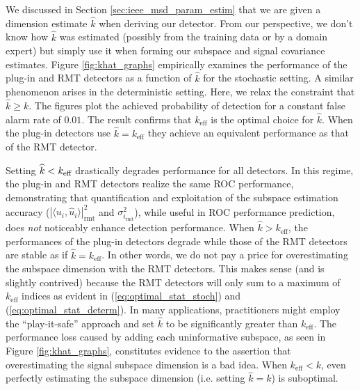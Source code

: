 We discussed in Section \ref{sec:ieee_msd_param_estim} that we are given a dimension estimate
$\widehat{k}$ when deriving our detector. From our perspective, we don't know how
$\widehat{k}$ was estimated (possibly from the training data or by a domain expert) but
simply use it when forming our subspace and signal covariance estimates. Figure
\ref{fig:khat_graphs} empirically examines the performance of the plug-in and RMT detectors
as a function of $\widehat{k}$ for the stochastic setting. A similar phenomenon arises in
the deterministic setting. Here, we relax the constraint that $\widehat{k}\geq k$. The figures plot the achieved probability of detection for a constant false alarm rate of $0.01$. The result confirms that $k_\text{eff}$ is the optimal choice for $\widehat{k}$. When the plug-in detectors use $\widehat{k} = k_\text{eff}$ they achieve an equivalent performance as that of the RMT detector.

Setting $\widehat{k} < k_\text{eff}$ drastically degrades performance for all detectors. In this regime, the plug-in and RMT detectors realize the same ROC performance, demonstrating that quantification and exploitation of the subspace estimation accuracy ($|\langle u_i,\widehat{u}_i\rangle |^2_{\text{rmt}}$ and $\sigma_{i_\text{rmt}}^2$), while useful in ROC performance prediction, does \textit{not} noticeably enhance detection performance. When $\widehat{k} > k_\text{eff}$, the performances of the plug-in detectors degrade while those of the RMT detectors are stable as if $\widehat{k}=k_\text{eff}$. In other words, we do not pay a price for overestimating the subspace dimension with the RMT detectors. This makes sense (and is slightly contrived) because the RMT detectors will only sum to a maximum of $k_\text{eff}$ indices as evident in (\ref{eq:optimal_stat_stoch}) and (\ref{eq:optimal_stat_determ}). In many applications, practitioners might employ the ``play-it-safe'' approach and set $\widehat{k}$ to be significantly greater than $k_\text{eff}$. The performance loss caused by adding each uninformative subspace, as seen in Figure \ref{fig:khat_graphs}, constitutes evidence to the assertion that overestimating the signal subspace dimension is a bad idea. When $k_\text{eff} < k$, even perfectly estimating the subspace dimension (i.e. setting $\widehat{k} = k$) is suboptimal.
